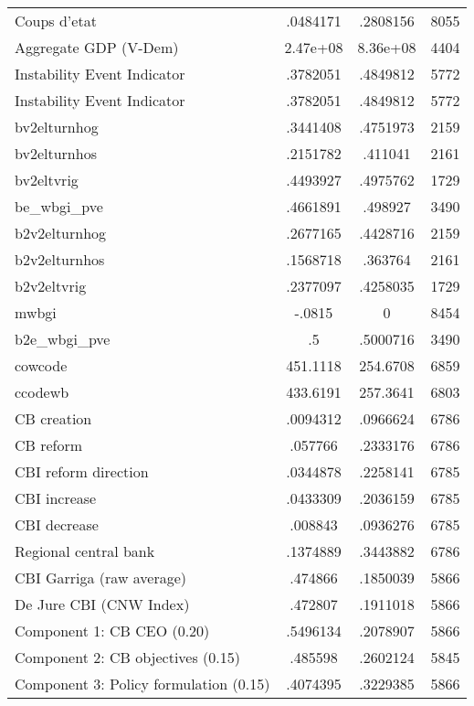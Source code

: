 {\begin{tabular}{l*{1}{ccc}}
Coups d'etat        &    .0484171&    .2808156&        8055\\
Aggregate GDP (V-Dem)&    2.47e+08&    8.36e+08&        4404\\
Instability Event Indicator&    .3782051&    .4849812&        5772\\
Instability Event Indicator&    .3782051&    .4849812&        5772\\
bv2elturnhog        &    .3441408&    .4751973&        2159\\
bv2elturnhos        &    .2151782&     .411041&        2161\\
bv2eltvrig          &    .4493927&    .4975762&        1729\\
be\_wbgi\_pve         &    .4661891&     .498927&        3490\\
b2v2elturnhog       &    .2677165&    .4428716&        2159\\
b2v2elturnhos       &    .1568718&     .363764&        2161\\
b2v2eltvrig         &    .2377097&    .4258035&        1729\\
mwbgi               &      -.0815&           0&        8454\\
b2e\_wbgi\_pve        &          .5&    .5000716&        3490\\
cowcode             &    451.1118&    254.6708&        6859\\
ccodewb             &    433.6191&    257.3641&        6803\\
CB creation         &    .0094312&    .0966624&        6786\\
CB reform           &     .057766&    .2333176&        6786\\
CBI  reform direction&    .0344878&    .2258141&        6785\\
CBI increase        &    .0433309&    .2036159&        6785\\
CBI decrease        &     .008843&    .0936276&        6785\\
Regional central bank&    .1374889&    .3443882&        6786\\
CBI Garriga (raw average)&     .474866&    .1850039&        5866\\
De Jure CBI (CNW Index)&     .472807&    .1911018&        5866\\
Component 1: CB CEO (0.20)&    .5496134&    .2078907&        5866\\
Component 2: CB objectives (0.15)&     .485598&    .2602124&        5845\\
Component 3: Policy formulation (0.15)&    .4074395&    .3229385&        5866\\

\end{tabular}}
